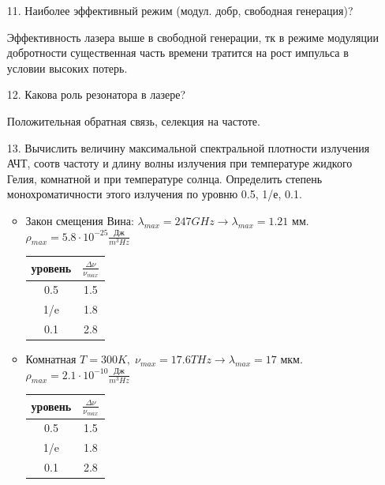 \documentclass[a4paper]{article}
\begin{document}
\begin{itemize}
	\item[11.] Наиболее эффективный режим (модул. добр, свободная генерация)? \par 
		Эффективность лазера выше в свободной генерации, тк в режиме модуляции добротности существенная часть времени тратится на рост импульса в условии высоких потерь.

	\item[12.] Какова роль резонатора в лазере? \par 
		Положительная обратная связь, селекция на частоте.

	\item[13.] Вычислить величину максимальной спектральной плотности излучения АЧТ, соотв частоту и длину волны излучения при температуре жидкого Гелия, 	
		комнатной и при температуре солнца. Определить степень монохроматичности этого излучения по уровню 0.5, 1/е, 0.1. \par 
		\begin{itemize}
			\item  Закон смещения Вина: $\lambda_{max} = 247 GHz \rightarrow \lambda_{max} = 1.21$ мм. $\rho_{max} = 5.8 \cdot 10^{-25} \frac{\text{Дж}}{m^3 Hz}$ \par 
			\begin{center}
				\begin{tabular}{c|c}
					уровень & $\frac{\Delta \nu}{\nu_{max}} $ \\ \hline
					0.5 & 1.5 \\ 
					1/e & 1.8 \\ 
					0.1 & 2.8 \\ 
				\end{tabular}
			\end{center}
				
			\item Комнатная $T=300K,\; \nu_{max} = 17.6 THz \rightarrow \lambda_{max} = 17$ мкм. $\rho_{max} = 2.1\cdot 10^{-10} \frac{\text{Дж}}{m^3 Hz}$ \par 
			\begin{center}
				\begin{tabular}{c|c}
					уровень & $\frac{\Delta \nu}{\nu_{max}} $ \\ \hline
					0.5 & 1.5 \\ 
					1/e & 1.8 \\ 
					0.1 & 2.8 \\ 
				\end{tabular}
			\end{center}


\end{itemize}
\end{itemize}
\end{document}
